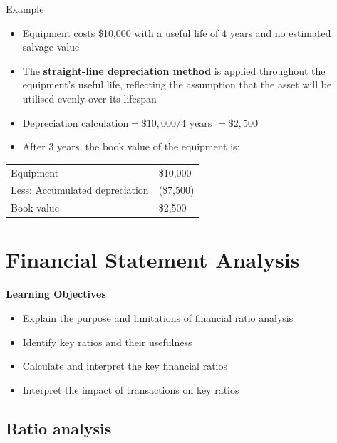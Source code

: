 \documentclass{article}
\begin{document}
		\begin{question}{Example}
			\begin{itemize}
				\item Equipment costs \$10,000 with a useful life of 4 years and no estimated salvage value
				\item The \textbf{straight-line depreciation method} is applied throughout the equipment's useful life, reflecting the assumption that the asset will be utilised evenly over its lifespan
				\item $\text{Depreciation calculation} = \$10,000 / 4 \text{ years } = \$2,500$
				\item After 3 years, the book value of the equipment is:
			\end{itemize}
			\begin{table}[H]
				\begin{center}
					\begin{tabular}[c]{p{8cm}p{3cm}}
						Equipment							& \$10,000	\\
						Less: Accumulated depreciation		& (\$7,500)	\\
						Book value							& \$2,500	\\
					\end{tabular}
				\end{center}
			\end{table}
		\end{question}

\section{Financial Statement Analysis}

	\textbf{Learning Objectives}

		\begin{itemize}
			\item Explain the purpose and limitations of financial ratio analysis
			\item Identify key ratios and their usefulness
			\item Calculate and interpret the key financial ratios
			\item Interpret the impact of transactions on key ratios
		\end{itemize}

	\subsection{Ratio analysis}
\end{document}
